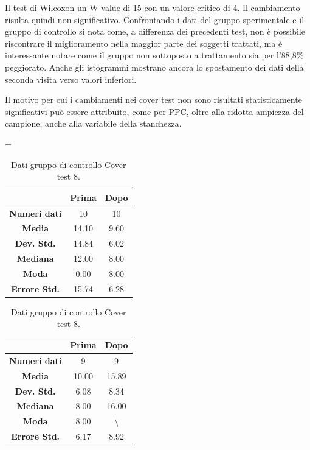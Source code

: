 Il test di Wilcoxon un W-value di 15 con un valore critico di 4. Il cambiamento risulta quindi non significativo. Confrontando i dati del gruppo sperimentale e il gruppo di controllo si nota come, a differenza dei precedenti test, non è possibile riscontrare il miglioramento nella maggior parte dei soggetti trattati, ma è interessante notare come il gruppo non sottoposto a trattamento sia per l’88,8\% peggiorato. Anche gli istogrammi mostrano ancora lo spostamento dei dati della seconda visita verso valori inferiori. 

Il motivo per cui i cambiamenti nei cover test non sono risultati statisticamente significativi può essere attribuito, come per PPC, oltre alla ridotta ampiezza del campione, anche alla variabile della stanchezza.

\begin{table}
\centering
\setlength\tabcolsep{4pt}
\begin{minipage}{0.48\textwidth}
\centering
\tablewidth=\textwidth

\begin{tabular}{|c|c|c|} \hline
{\textbf{}} & {\textbf{  \hspace{8pt}Prima\hspace{8pt} }} & {\textbf{ \hspace{8pt}Dopo\hspace{8pt}  }}\\ \hline
\textbf{Numeri dati} & 10 & 10 \\ 
\textbf{Media} & 14.10 & 9.60 \\  
\textbf{Dev. Std.} & 14.84 & 6.02 \\  
\textbf{Mediana} & 12.00 & 8.00 \\ 
\textbf{Moda} & 0.00 & 8.00 \\ 
\textbf{Errore Std.} & 15.74 & 6.28 \\ 
\hline
\end{tabular}
\caption{Dati gruppo sperimentale Cover test 8.}

\label{tab:accuracy} 
\end{minipage}%
\hfill
\begin{minipage}{0.48\textwidth}
\centering

\begin{tabular}{|c|c|c|} \hline
{\textbf{}} & {\textbf{  \hspace{8pt}Prima\hspace{8pt} }} & {\textbf{ \hspace{8pt}Dopo\hspace{8pt}  }}\\ \hline
\textbf{Numeri dati} & 9 & 9 \\ 
\textbf{Media} & 10.00 & 15.89 \\  
\textbf{Dev. Std.} & 6.08 & 8.34 \\  
\textbf{Mediana} & 8.00 & 16.00 \\  
\textbf{Moda} & 8.00 & \textbackslash \\
\textbf{Errore Std.} & 6.17 & 8.92 \\
\hline
\end{tabular}
\caption{Dati gruppo di controllo Cover test 8.}


\end{minipage}
\end{table}
